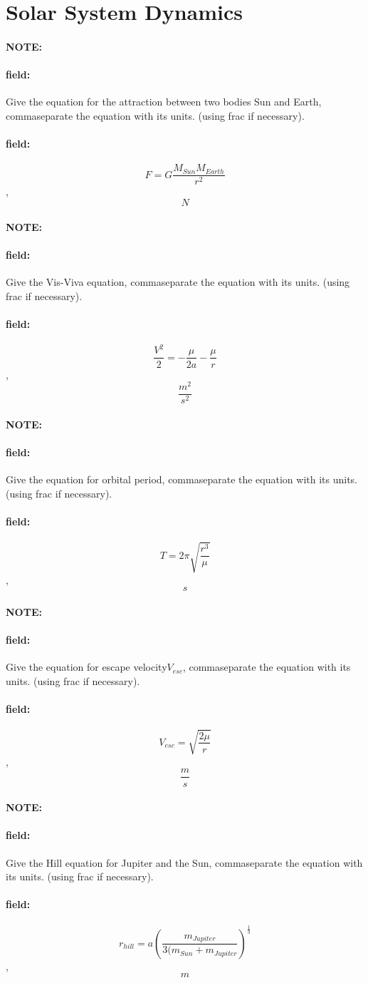 \documentclass[12pt]{article}
\newenvironment{note}{\paragraph{NOTE:}}{}
\newenvironment{field}{\paragraph{field:}}{}
\begin{document}
\section{Solar System Dynamics}
\begin{note}
   \begin{field}
       Give the equation for the attraction between two bodies Sun and Earth, commaseparate the equation with its units. (using frac if necessary).
   \end{field}
   \begin{field}
		\[
			F=G\frac{M_{Sun}M_{Earth}}{r^2}
		\],
		\[
			N
		\]
   \end{field}
\end{note}
\begin{note}
   \begin{field}
       Give the Vis-Viva equation, commaseparate the equation with its units. (using frac if necessary).
   \end{field}
   \begin{field}
		\[
			\frac{V^2}{2}=-\frac{\mu}{2a}-\frac{\mu}{r}
		\],
		\[
			\frac{m^2}{s^2}
		\]
   \end{field}
\end{note}
\begin{note}
   \begin{field}
       Give the equation for orbital period, commaseparate the equation with its units. (using frac if necessary).
   \end{field}
   \begin{field}
		\[
			T=2\pi\sqrt{\frac{r^3}{\mu}}
		\],
		\[
			s
		\]
   \end{field}
\end{note}
\begin{note}
   \begin{field}
       Give the equation for escape velocity\(V_{esc}\), commaseparate the equation with its units. (using frac if necessary).
   \end{field}
   \begin{field}
		\[
			V_{esc}=\sqrt{\frac{2\mu}{r}}
		\],
		\[
			\frac{m}{s}
		\]
   \end{field}
\end{note}
\begin{note}
   \begin{field}
       Give the Hill equation for Jupiter and the Sun, commaseparate the equation with its units. (using frac if necessary).
   \end{field}
   \begin{field}
		\[
			r_{hill}=a{\left(\frac{m_{Jupiter}}{3(m_{Sun}+m_{Jupiter}}\right)}^{\frac{1}{3}}
		\],
		\[
			m
		\]
   \end{field}
\end{note}
\end{document}
